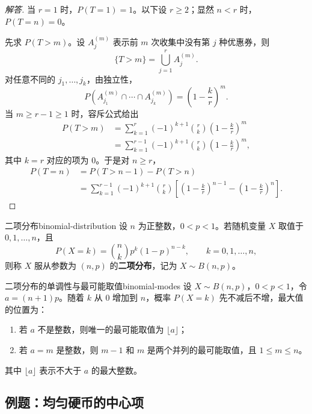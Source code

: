 \begin{proof}[解答]
当 $r=1$ 时，$P(T=1)=1$。以下设 $r\geq2$；显然 $n<r$ 时，$P(T=n)=0$。

先求 $P(T>m)$。设 $A_j^{(m)}$ 表示前 $m$ 次收集中没有第 $j$ 种优惠券，则
\[
\{T>m\}=\bigcup_{j=1}^rA_j^{(m)}.
\]
对任意不同的 $j_1,\ldots,j_k$，由独立性，
\[
P\left(A_{j_1}^{(m)}\cap\cdots\cap A_{j_k}^{(m)}\right)
=\left(1-\frac kr\right)^m.
\]
当 $m\geq r-1\geq1$ 时，容斥公式给出
\[
\begin{aligned}
P(T>m)
&=\sum_{k=1}^r(-1)^{k+1}\binom rk
\left(1-\frac kr\right)^m\\
&=\sum_{k=1}^{r-1}(-1)^{k+1}\binom rk
\left(1-\frac kr\right)^m,
\end{aligned}
\]
其中 $k=r$ 对应的项为 $0$。于是对 $n\geq r$，
\[
\begin{aligned}
P(T=n)
&=P(T>n-1)-P(T>n)\\
&=\sum_{k=1}^{r-1}(-1)^{k+1}\binom rk
\left[
\left(1-\frac kr\right)^{n-1}
-\left(1-\frac kr\right)^n
\right].
\end{aligned}
\]
\end{proof}

\begin{mydefinition}{二项分布}{binomial-distribution}
设 $n$ 为正整数，$0<p<1$。若随机变量 $X$ 取值于 $0,1,\ldots,n$，且
\[
P(X=k)=\binom nk p^k(1-p)^{n-k},
\qquad k=0,1,\ldots,n,
\]
则称 $X$ 服从参数为 $(n,p)$ 的\textbf{二项分布}，记为 $X\sim B(n,p)$。
\end{mydefinition}

\begin{proposition}{二项分布的单调性与最可能取值}{binomial-modes}
设 $X\sim B(n,p)$，$0<p<1$，令 $a=(n+1)p$。随着 $k$ 从 $0$ 增加到 $n$，概率 $P(X=k)$ 先不减后不增，最大值的位置为：
\begin{enumerate}
    \item 若 $a$ 不是整数，则唯一的最可能取值为 $\lfloor a\rfloor$；
    \item 若 $a=m$ 是整数，则 $m-1$ 和 $m$ 是两个并列的最可能取值，且 $1\leq m\leq n$。
\end{enumerate}
其中 $\lfloor a\rfloor$ 表示不大于 $a$ 的最大整数。
\end{proposition}

\subsection{例题：均匀硬币的中心项}\label{note:c2:e5}
